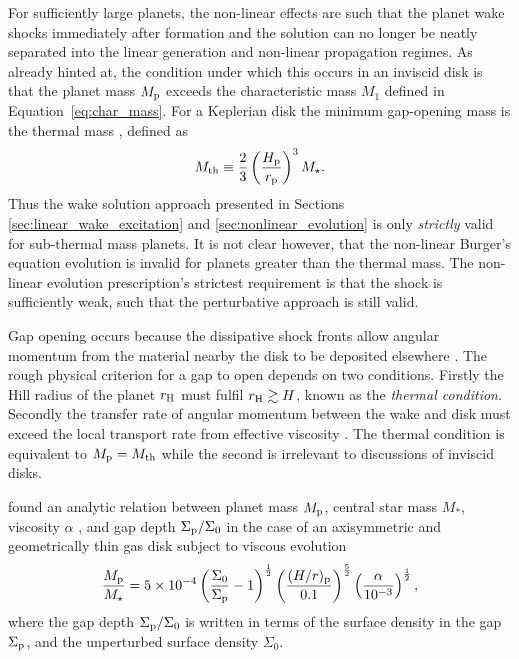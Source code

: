 For sufficiently large planets, the non-linear effects are such that the planet wake shocks immediately after formation and the solution can no longer be neatly separated into the linear generation and non-linear propagation regimes.
As already hinted at, the condition under which this occurs in an inviscid disk is that the planet mass $M_{\rm p}$ exceeds the characteristic mass $M_1$ defined in Equation~\eqref{eq:char_mass}.
For a Keplerian disk the minimum gap-opening mass is the thermal mass \citep{lin1993}, defined as \citep{goodman2001}
\begin{align}
    M_{\rm th} \equiv \frac{2}{3} \left( \frac{H_{\rm p}}{r_{\rm p}}  \right)^3 M_\star. \label{eq:thermalmass}
\end{align}
Thus the wake solution approach presented in Sections \ref{sec:linear_wake_excitation} and \ref{sec:nonlinear_evolution} is only \textit{strictly} valid for sub-thermal mass planets. It is not clear however, that the non-linear Burger's equation evolution is invalid for planets greater than the thermal mass. The non-linear evolution prescription's strictest requirement is that the shock is sufficiently weak, such that the perturbative approach is still valid.

Gap opening occurs because the dissipative shock fronts allow angular momentum from the material nearby the disk to be deposited elsewhere \citep{lin1979,goldreich1979,goldreich1980}.
The rough physical criterion for a gap to open depends on two conditions.
Firstly the Hill radius of the planet $r_{\rm H}$ \citep{hill1878} must fulfil $r_{\rm H} \gtrsim H$, known as the \textit{thermal condition}.
Secondly the transfer rate of angular momentum between the wake and disk must exceed the local transport rate from effective viscosity \citep{lin1993}.
The thermal condition is equivalent to $M_{\rm p} = M_{\rm th}$ while the second is irrelevant to discussions of inviscid disks.

\citet{kanagawa2015} found an analytic relation between planet mass $M_{\rm p}$, central star mass $M_*$, viscosity $\alpha$ \citep{shakura1973}, and gap depth $\Sigma_{\rm p} / \Sigma_0$ in the case of an axisymmetric and geometrically thin gas disk subject to viscous evolution
\begin{align}
    \frac{M_{\rm p}}{M_\star} = 5 \times 10^{-4} \left( \frac{\Sigma_0}{\Sigma_{\rm p}} - 1 \right)^{\frac{1}{2}} \left( \frac{(H/r)_{\rm p}}{0.1}  \right)^{\frac{5}{2}} \left( \frac{\alpha}{10^{-3}} \right)^{\frac{1}{2}}, \label{eq:kanagawa_gap_depth}
\end{align}
where the gap depth $\Sigma_{\rm p} / \Sigma_0$ is written in terms of the surface density in the gap $\Sigma_{\rm p}$, and the unperturbed surface density $\Sigma_0$.

